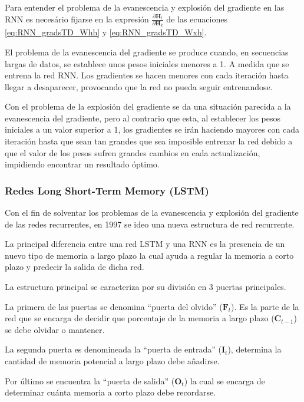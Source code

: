 \documentclass[a4paper,12pt]{article}
\begin{document}
Para entender el problema de la evanescencia y explosión 
del gradiente en las RNN es necesário fijarse en la expresión
$\frac{\partial\mathbf{H}_{t}}{\partial\mathbf{H}_{k}}$
de las ecuaciones \ref{eq:RNN_gradsTD_Whh} y 
\ref{eq:RNN_gradsTD_Wxh}.

El problema de la evanescencia del gradiente se produce 
cuando, en secuencias largas de datos, se establece unos
pesos iniciales menores a 1. A medida que se entrena 
la red RNN. Los gradientes se hacen menores con cada 
iteración hasta llegar a desaparecer, provocando que 
la red no pueda seguir entrenandose.

Con el problema de la explosión del gradiente se da 
una situación parecida a la evanescencia del gradiente,
pero al contrario que esta, al establecer los pesos 
iniciales a un valor superior a 1, los gradientes 
se irán haciendo mayores con cada iteración hasta que 
sean tan grandes que sea imposible entrenar la red 
debido a que el valor de los pesos sufren grandes cambios
en cada actualización, impidiendo encontrar un resultado 
óptimo.

\subsubsection{Redes Long Short-Term Memory (LSTM)}

Con el fin de solventar los problemas de la evanescencia
y explosión del gradiente de las redes recurrentes, 
en 1997 se ideo una nueva estructura de red recurrente.

La principal diferencia entre una red LSTM y una RNN 
es la presencia de un nuevo tipo de memoria a largo
plazo la cual ayuda a regular la memoria a corto 
plazo y predecir la salida de dicha red.

La estructura principal se caracteriza por su división 
en 3 puertas principales.

La primera de las puertas se denomina ``puerta del olvido''
($\mathbf{F}_{t}$). Es la parte de la red que se encarga 
de decidir que porcentaje de la memoria a largo plazo
($\mathbf{C}_{t-1}$) se debe olvidar o mantener. 

La segunda puerta es denomineada la ``puerta de entrada''
($\mathbf{I}_{t}$), determina la cantidad de memoria 
potencial a largo plazo debe añadirse.

Por último se encuentra la ``puerta de salida''
($\mathbf{O}_{t}$) la cual se encarga de determinar 
cuánta memoria a corto plazo debe recordarse.
\end{document}
